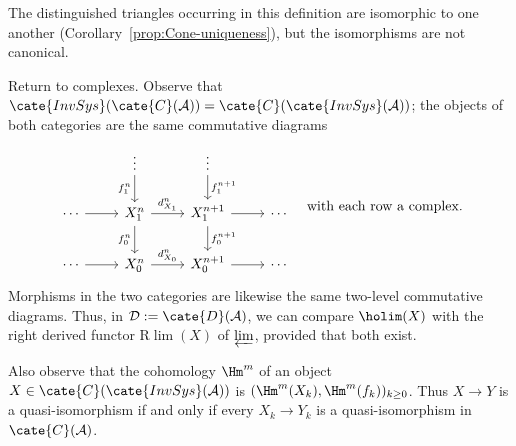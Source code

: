 The distinguished triangles occurring in this definition are isomorphic to
one another (Corollary~\ref{prop:Cone-uniqueness}), but the isomorphisms are
not canonical.

Return to complexes. Observe that
$\cate{InvSys}(\cate{C}(\mathcal{A}))=
\cate{C}(\cate{InvSys}(\mathcal{A}))$; the objects of both categories are the
same commutative diagrams
\[\begin{tikzcd}
	& \vdots \arrow[d, "{f_1^n}"'] & \vdots \arrow[d, "{f_1^{n+1}}"] & \\
	\cdots \arrow[r] & X_1^n \arrow[r, "{d_{X_1}^n}"] \arrow[d, "{f_0^n}"'] & X_1^{n+1} \arrow[d, "{f_0^{n+1}}"] \arrow[r] & \cdots \\
	\cdots \arrow[r] & X_0^n \arrow[r, "{d_{X_0}^n}"] & X_0^{n+1} \arrow[r] & \cdots
\end{tikzcd} \quad \text{with each row a complex}. \]
Morphisms in the two categories are likewise the same two-level commutative
diagrams. Thus, in $\mathcal{D}:=\cate{D}(\mathcal{A})$, we can compare
$\holim(X)$ with the right derived functor $\mathrm{R}\lim(X)$ of
$\varprojlim$, provided that both exist.

Also observe that the cohomology $\Hm^m$ of an object
$X\in\cate{C}(\cate{InvSys}(\mathcal{A}))$ is
$(\Hm^m(X_k),\Hm^m(f_k))_{k\geq0}$. Thus $X\to Y$ is a quasi-isomorphism if
and only if every $X_k\to Y_k$ is a quasi-isomorphism in
$\cate{C}(\mathcal{A})$.

